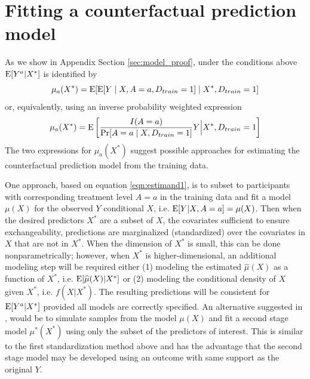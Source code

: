 \section{Fitting a counterfactual prediction model} \label{sec:model}

As we show in Appendix Section \ref{sec:model_proof}, under the conditions above $\operatorname{E}[Y^a | X^*]$ is identified by
\begin{equation}\label{eqn:estimand1}
    \mu_a(X^*) = \operatorname{E}[\operatorname{E}[Y \mid X, A = a, D_{train} = 1] \mid X^*, D_{train} = 1]
\end{equation}
or, equivalently, using an inverse probability weighted expression 
\begin{equation}\label{eqn:estimand2}
    \mu_a(X^*) = \operatorname{E}\left[\frac{I(A = a)}{\Pr[A = a \mid X, D_{train} = 1]} Y \Big| X^*, D_{train} = 1\right]
\end{equation}
The two expressions for $\mu_a(X^*)$ suggest possible approaches for estimating the counterfactual prediction model from the training data. 

One approach, based on equation \ref{eqn:estimand1}, is to subset to participants with corresponding treatment level $A = a$ in the training data and fit a model $\mu(X)$ for the observed $Y$ conditional $X$, i.e. $\operatorname{E}[Y | X, A = a] = \mu(X)$. Then when the desired predictors $X^*$ are a subset of $X$, the covariates sufficient to ensure exchangeability,  predictions are marginalized (standardized) over the covariates in $X$ that are not in $X^*$. When the dimension of $X^*$ is small, this can be done nonparametrically; however, when $X^*$ is higher-dimensional, an additional modeling step will be required either (1) modeling the estimated $\widehat{\mu}(X)$ as a function of $X^*$, i.e. $\operatorname{E}[\widehat{\mu}(X) | X^*]$ or (2) modeling the conditional density of $X$ given $X^*$, i.e. $f(X | X^*)$.  The resulting predictions will be consistent for $\operatorname{E}[Y^a | X^*]$ provided all models are correctly specified. An alternative suggested in \cite{dickerman_predicting_2022}, would be to simulate samples from the model $\mu(X)$ and fit a second stage model $\mu^*(X^*)$ using only the subset of the predictors of interest. This is similar to the first standardization method above and has the advantage that the second stage model may be developed using an outcome with same support as the original $Y$.

